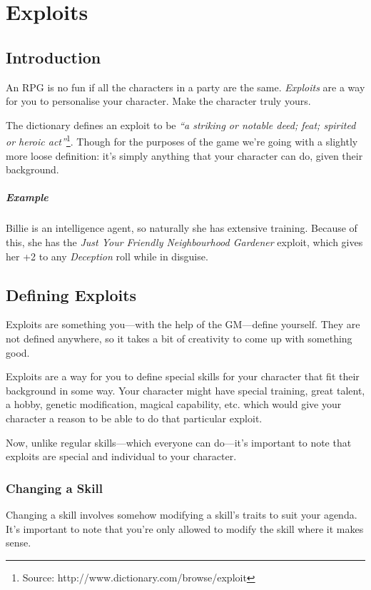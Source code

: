 \chapter{Exploits}
\section{Introduction}
An RPG is no fun if all the characters in a party are the same. \textit{Exploits} are a way for you to personalise your character. Make the character truly yours.

The dictionary defines an exploit to be \textit{``a striking or notable deed; feat; spirited or heroic act''}\footnote{Source: http://www.dictionary.com/browse/exploit}. 
Though for the purposes of the game we're going with a slightly more loose definition: it's simply anything that your character can do, given their background.

\paragraph{Example} Billie is an intelligence agent, so naturally she has extensive training. Because of this, she has the \textit{Just Your Friendly Neighbourhood Gardener} exploit, which gives her +2 to any \textit{Deception} roll while in disguise.

\section{Defining Exploits}

Exploits are something you---with the help of the GM---define yourself. 
They are not defined anywhere, so it takes a bit of creativity to come up with something good.

Exploits are a way for you to define special skills for your character that fit their background in some way. Your character might have special training, great talent, a hobby, genetic modification, magical capability, etc. which would give your character a reason to be able to do that particular exploit.

Now, unlike regular skills---which everyone can do---it's important to note that exploits are special and individual to your character.

\subsection{Changing a Skill}
Changing a skill involves somehow modifying a skill's traits to suit your agenda. It's important to note that you're only allowed to modify the skill where it makes sense. 
